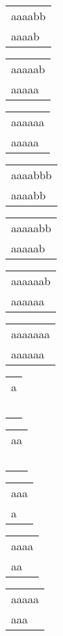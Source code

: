 \begin{description}
\begin{tabular}{|l|}
aaaabb \\
aaaab\  \\
\hline
\end{tabular} 
\begin{tabular}{|l|} \hline
aaaaab \\
aaaaa\  \\
\hline
\end{tabular} 
\begin{tabular}{|l|} \hline
aaaaaa \\
aaaaa\  \\
\hline
\end{tabular} 
\begin{tabular}{|l|} \hline
aaaabbb \\
aaaabb\  \\
\hline
\end{tabular} 
\begin{tabular}{|l|} \hline
aaaaabb \\
aaaaab\  \\
\hline
\end{tabular} 
\begin{tabular}{|l|} \hline
aaaaaab \\
aaaaaa\  \\
\hline
\end{tabular} 
\begin{tabular}{|l|} \hline
aaaaaaa \\
aaaaaa\  \\
\hline
\end{tabular} 
\begin{tabular}{|l|} \hline
a \\
\  \\
\hline
\end{tabular} 
\begin{tabular}{|l|} \hline
aa \\
\ \  \\
\hline
\end{tabular} 
\begin{tabular}{|l|} \hline
aaa \\
a\ \  \\
\hline
\end{tabular} 
\begin{tabular}{|l|} \hline
aaaa \\
aa\ \  \\
\hline
\end{tabular} 
\begin{tabular}{|l|} \hline
aaaaa \\
aaa\ \  \\

\end{tabular}
\end{description}

